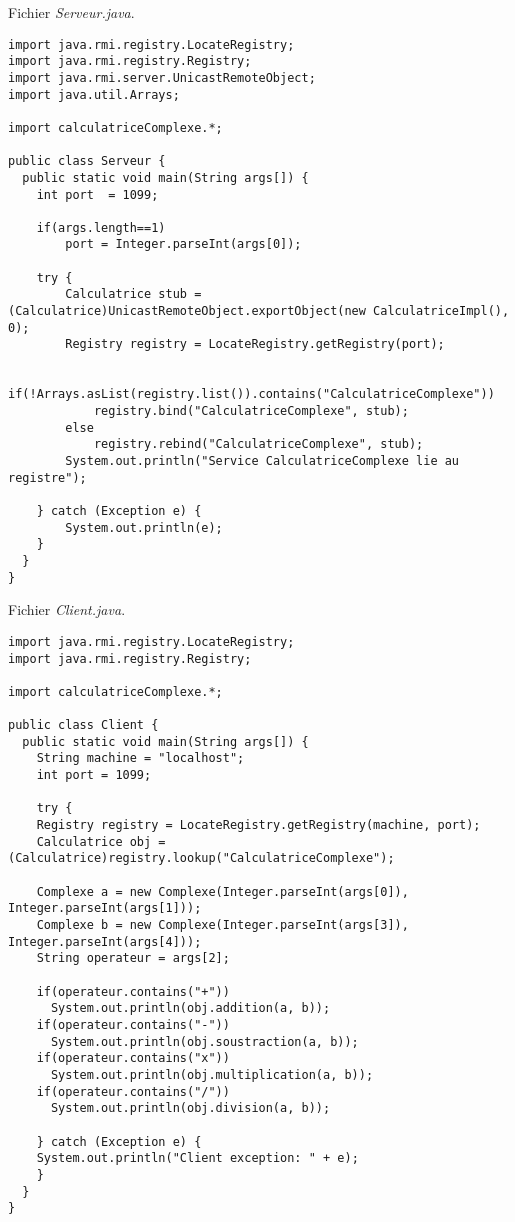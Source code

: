 \documentclass{article}
\begin{document}
Fichier \emph{Serveur.java}.
\begin{lstlisting}
import java.rmi.registry.LocateRegistry;
import java.rmi.registry.Registry;
import java.rmi.server.UnicastRemoteObject;
import java.util.Arrays;

import calculatriceComplexe.*;

public class Serveur {
  public static void main(String args[]) {
    int port  = 1099;

    if(args.length==1)
        port = Integer.parseInt(args[0]);

    try {
        Calculatrice stub = (Calculatrice)UnicastRemoteObject.exportObject(new CalculatriceImpl(), 0);
        Registry registry = LocateRegistry.getRegistry(port);

        if(!Arrays.asList(registry.list()).contains("CalculatriceComplexe"))
            registry.bind("CalculatriceComplexe", stub);
        else
            registry.rebind("CalculatriceComplexe", stub);
        System.out.println("Service CalculatriceComplexe lie au registre");

    } catch (Exception e) {
        System.out.println(e);
    }
  }
}
\end{lstlisting}

Fichier \emph{Client.java}.
\begin{lstlisting}
import java.rmi.registry.LocateRegistry;
import java.rmi.registry.Registry;

import calculatriceComplexe.*;

public class Client {
  public static void main(String args[]) {
    String machine = "localhost";
    int port = 1099;

    try {
    Registry registry = LocateRegistry.getRegistry(machine, port);
    Calculatrice obj = (Calculatrice)registry.lookup("CalculatriceComplexe");

    Complexe a = new Complexe(Integer.parseInt(args[0]), Integer.parseInt(args[1]));
    Complexe b = new Complexe(Integer.parseInt(args[3]), Integer.parseInt(args[4]));
    String operateur = args[2];

    if(operateur.contains("+"))
      System.out.println(obj.addition(a, b));
    if(operateur.contains("-"))
      System.out.println(obj.soustraction(a, b));
    if(operateur.contains("x"))
      System.out.println(obj.multiplication(a, b));
    if(operateur.contains("/"))
      System.out.println(obj.division(a, b));

    } catch (Exception e) {
    System.out.println("Client exception: " + e);
    }
  }
}
\end{lstlisting}
\end{document}

